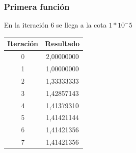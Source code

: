 \documentclass[titlepage,a4paper]{article}
\begin{document}
\subsubsection{Primera función}\label{sec:sec1}
En la iteración 6 se llega a la cota $1*10^-5$
\begin{center}
    \begin{tabular}{| c | c |}
    \hline
     Iteración & Resultado \\ \hline
        0     & 2,00000000 \\
        1     & 1,00000000 \\
        2     & 1,33333333 \\
        3     & 1,42857143 \\
        4     & 1,41379310 \\
        5     & 1,41421144 \\
        6     & 1,41421356 \\
        7     & 1,41421356 \\
    \hline
    \end{tabular}
\end{center}
\end{document}
